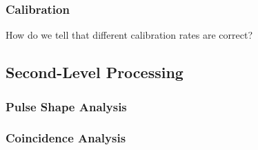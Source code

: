 \subsubsection{Calibration}
How do we tell that different calibration rates are correct?
\label{ssec:Calibration}
\subsection{Second-Level Processing}
\subsubsection{Pulse Shape Analysis}
\subsubsection{Coincidence Analysis}



